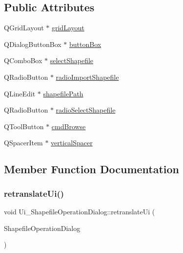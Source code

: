\subsection*{Public Attributes}
\begin{DoxyCompactItemize}
\item 
Q\+Grid\+Layout $\ast$ \mbox{\hyperlink{class_ui___shapefile_operation_dialog_a1150932f0f2d5c795f4a10f6b63781d0}{grid\+Layout}}
\item 
Q\+Dialog\+Button\+Box $\ast$ \mbox{\hyperlink{class_ui___shapefile_operation_dialog_ae42e66ab09e14c9fa41eb6183f7db7ba}{button\+Box}}
\item 
Q\+Combo\+Box $\ast$ \mbox{\hyperlink{class_ui___shapefile_operation_dialog_a819d6052006a2bd23b959300b163f78e}{select\+Shapefile}}
\item 
Q\+Radio\+Button $\ast$ \mbox{\hyperlink{class_ui___shapefile_operation_dialog_ab736a23223c265d3c5050e3ec7277d78}{radio\+Import\+Shapefile}}
\item 
Q\+Line\+Edit $\ast$ \mbox{\hyperlink{class_ui___shapefile_operation_dialog_a90bb34d075dde96388931b02f167ee60}{shapefile\+Path}}
\item 
Q\+Radio\+Button $\ast$ \mbox{\hyperlink{class_ui___shapefile_operation_dialog_a361dda976dfef00819ff8202a3850710}{radio\+Select\+Shapefile}}
\item 
Q\+Tool\+Button $\ast$ \mbox{\hyperlink{class_ui___shapefile_operation_dialog_ae239df7bd8b229b924f0c0c9b42d284f}{cmd\+Browse}}
\item 
Q\+Spacer\+Item $\ast$ \mbox{\hyperlink{class_ui___shapefile_operation_dialog_abdd812679272d65234e6ff9b85f0e303}{vertical\+Spacer}}
\end{DoxyCompactItemize}


\subsection{Member Function Documentation}
\mbox{\label{class_ui___shapefile_operation_dialog_a794fd9dbabf602cecb777646ee5c5803}} 
\subsubsection{\texorpdfstring{retranslateUi()}{retranslateUi()}}
{\footnotesize\ttfamily void Ui\+\_\+\+Shapefile\+Operation\+Dialog\+::retranslate\+Ui (\begin{DoxyParamCaption}\item[{Q\+Dialog $\ast$}]{Shapefile\+Operation\+Dialog }\end{DoxyParamCaption})\hspace{0.3cm}{\ttfamily [inline]}}

